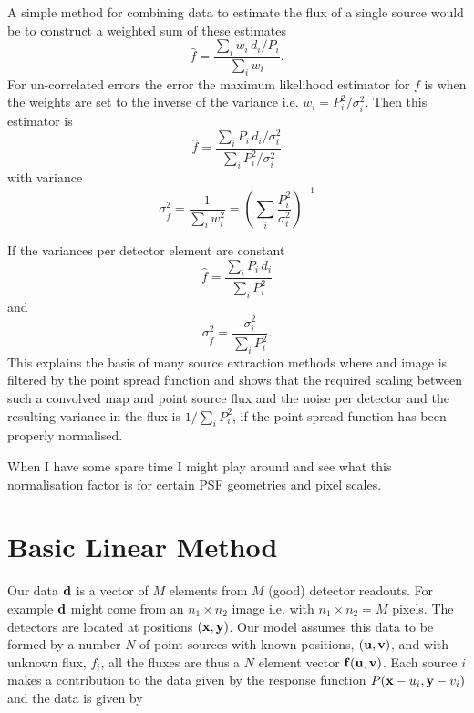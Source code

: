 \documentclass{article}
\begin{document}
A simple method for combining data to estimate the flux of a single source would be to construct a weighted sum of these estimates
\begin{equation}
\hat{f}=\frac{\sum_i w_i\, d_i/P_i}{\sum_i w_i}.
\end{equation}
For un-correlated errors the error the maximum likelihood estimator for $f$ is when the weights are set to the inverse of the variance i.e. $w_i=P_i^2/\sigma_i^2$.  Then this estimator is
 \begin{equation}
 \hat{f}=\frac{\sum_i P_i\, d_i/\sigma_i^2}{\sum_i P_i^2/\sigma_i^2}
 \end{equation}
 with variance
 \begin{equation}
\sigma^2_{\hat{f}}=\frac{1}{\sum_i w_i^2}=\left(\sum_i{\frac{P_i^2}{\sigma_i^2}}\right)^{-1}
 \end{equation}
 
 If the variances per detector element are constant
 \begin{equation}
 \hat{f}=\frac{\sum_i P_i\, d_i}{\sum_i P_i^2}
 \end{equation}
and 
 \begin{equation}
\sigma^2_{\hat{f}}=\frac{{\sigma_i^2}}{\sum_i P_i^2}.
 \end{equation}
This explains the basis of many source extraction methods where and image is filtered by the point spread function and shows that the required scaling between such a convolved map and point source flux and the noise per detector and the resulting variance in the flux is ${{1}}/{\sum_i P_i^2}$, if the point-spread function has been properly normalised.

When I have some spare time I might play around and see what this normalisation factor is for certain PSF geometries and pixel scales.


\section{Basic Linear Method}
Our data ${\bf d}$ is a vector of $M$ elements from $M$ (good) detector readouts. For example ${\bf d}$ might come from an $n_1\times n_2$ image i.e. with $n_1\times n_2=M$ pixels.  The detectors are located at positions $({\bf x,y})$.  Our model assumes this data to be formed by a number $N$ of point sources with known positions,  ${\bf (u,v)}$, and with unknown flux, $f_i$, all the fluxes are thus a $N$ element vector ${\bf f(u,v)}$.  Each source $i$ makes a contribution to the data given by the response function $P({\bf x}-u_i, {\bf y}-v_i)$ and the data is given by
\end{document}
